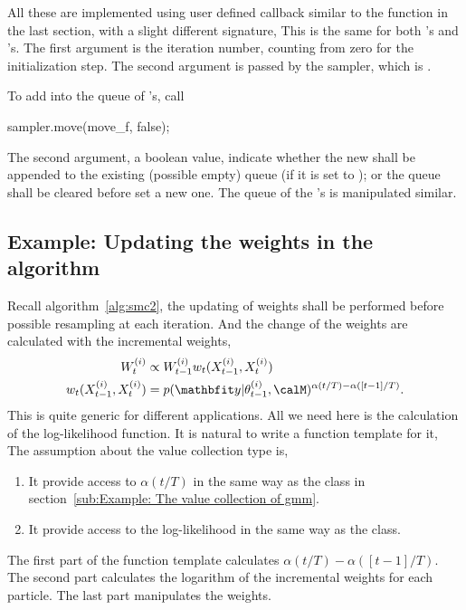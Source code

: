 All these are implemented using user defined callback similar to the
 function in the last section, with a slight different
signature,
This is the same for both 's and 's. The first
argument is the iteration number, counting from zero for the initialization
step. The second argument is passed by the sampler, which is
.

To add  into the queue of 's, call
\begin{cppcode}
sampler.move(move_f, false);
\end{cppcode}
The second argument, a boolean value, indicate whether the new
 shall be appended to the existing (possible empty) queue (if
it is set to ); or the queue shall be cleared before set a
new one. The queue of the 's is manipulated similar.

\subsection{Example: Updating the weights in the \smc[2] algorithm}
\label{sub:Example: Updating the weights in the SMC2 algorithm}

Recall algorithm~\ref{alg:smc2}, the updating of weights shall be performed
before possible resampling at each iteration. And the change of the weights
are calculated with the incremental weights,
\begin{align*}
  W_t^{(i)} &\propto W_{t-1}^{(i)} w_t(X_{t-1}^{(i)}, X_t^{(i)}) \\
  w_t(X_{t-1}^{(i)}, X_t^{(i)}) &=
  p(\data|\theta_{t-1}^{(i)},\calM)^{\alpha(t/T) - \alpha([t-1]/T)}.
\end{align*}
This is quite generic for different applications. All we need here is the
calculation of the log-likelihood function. It is natural to write a function
template for it,
The assumption about the value collection type  is,
\begin{enumerate}
  \item It provide access to $\alpha(t/T)$ in the same way as the
     class in section~\ref{sub:Example: The value collection of
      gmm}.
  \item It provide access to the log-likelihood in the same way as the
     class.
\end{enumerate}
The first part of the function template  calculates
$\alpha(t/T) - \alpha([t-1]/T)$. The second part calculates the logarithm of
the incremental weights for each particle. The last part manipulates the
weights.


